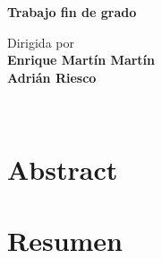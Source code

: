 \documentclass[11pt,a4paper]{article}
\begin{document}
\begin{frontmatter}
\vfill

\begin{center}
  {\Large \textbf{Trabajo fin de grado}}
\end{center}

\vfill

\begin{large}
\begin{center}
{Dirigida por}  \\ [0.3em]
\textbf{Enrique Martín Martín}\\[0.3em]
\textbf{Adrián Riesco}
\begin{large}
\begin{center}
\vspace{3ex}
\end{center}
\end{large}
\end{center}

\vfill

\end{large}

\newpage

\thispagestyle{empty}
\mbox{ }

\clearpage


%


\end{frontmatter}

%

\section*{Abstract}


\newpage

\section*{Resumen}

\end{document}
